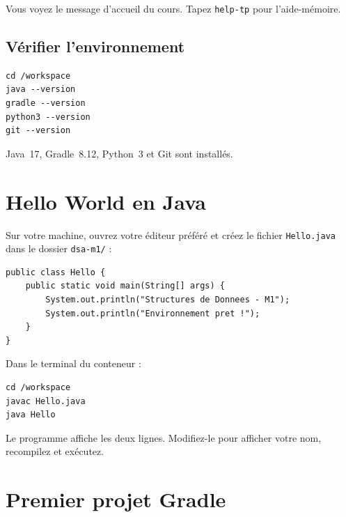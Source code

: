 \documentclass[11pt,a4paper]{article}
\begin{document}
\begin{infobox}
Vous voyez le message d'accueil du cours. Tapez \texttt{help-tp} pour l'aide-mémoire.
\end{infobox}

\subsection{Vérifier l'environnement}

\begin{lstlisting}[style=bash]
cd /workspace
java --version
gradle --version
python3 --version
git --version
\end{lstlisting}

\begin{exercicebox}[Vérification 2]
Java~17, Gradle~8.12, Python~3 et Git sont installés.
\end{exercicebox}

\section{Hello World en Java}

Sur votre machine, ouvrez votre éditeur préféré et créez le fichier \texttt{Hello.java} dans le dossier \texttt{dsa-m1/} :

\begin{lstlisting}[style=java]
public class Hello {
    public static void main(String[] args) {
        System.out.println("Structures de Donnees - M1");
        System.out.println("Environnement pret !");
    }
}
\end{lstlisting}

Dans le terminal du conteneur :

\begin{lstlisting}[style=bash]
cd /workspace
javac Hello.java
java Hello
\end{lstlisting}

\begin{exercicebox}[Vérification 3]
Le programme affiche les deux lignes. Modifiez-le pour afficher votre nom, recompilez et exécutez.
\end{exercicebox}

\section{Premier projet Gradle}
\end{document}
